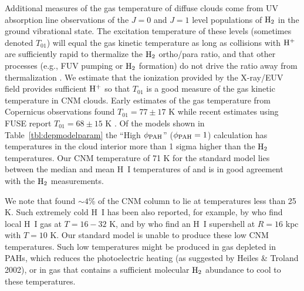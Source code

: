 \documentclass[12pt,preprint,flushrt]{aastex}
\begin{document}
Additional measures
of the gas temperature of diffuse clouds come from UV absorption 
line observations of the $J = 0$ and $J = 1$ level populations of 
${\rm H_2}$ in the ground vibrational state. The excitation temperature
of these levels (sometimes denoted $T_{01}$) will equal the
gas kinetic temperature as long as collisions with ${\rm H^+}$ are
sufficiently rapid to thermalize the ${\rm H_2}$ ortho/para ratio,
and that other processes (e.g., FUV pumping or ${\rm H_2}$ formation)
do not drive the ratio away from thermalization 
\citep[see e.g.,][]{dal77,bla87,bur92,ste99}. 
We estimate that the ionization provided by the X-ray/EUV
field provides sufficient ${\rm H^+}$ so that
$T_{01}$ is a good measure of the gas kinetic temperature in CNM clouds. 
Early
estimates of the gas temperature from Copernicus observations found
$T_{01} = 77 \pm 17$  K \citep{sav77} while recent estimates using FUSE 
report $T_{01} = 68 \pm 15$ K \citep{rac02}. Of the models shown
in Table~\ref{tbl:depmodelparam} the ``High $\phi_{\rm PAH}$'' 
($\phi_{\rm PAH} = 1$) 
calculation has  temperatures in the cloud interior
more than 1 sigma  higher than the ${\rm H_2}$ temperatures.
Our CNM temperature of 71 K for the standard model  
lies between the median and mean H~I temperatures of \cite{hei02}
and is in good agreement with the ${\rm H_2}$ measurements.  

We note that \cite{hei02} found $\sim 4$\% of the CNM column 
to lie at temperatures less than 25 K. Such extremely cold H~I
has been also reported, for example,  by \cite{gib00} who find local 
H~I gas
at $T=16-32$ K, and by \cite{knee01} who find an H~I supershell at 
$R= 16$ kpc with $T=10$ K. Our standard model is unable to produce these
low CNM temperatures.  
Such low temperatures might be produced in  
gas depleted in PAHs, which reduces 
the photoelectric heating (as suggested by Heiles \& Troland 2002), or
in  gas that contains a sufficient molecular ${\rm H_2}$ abundance  
to cool to these temperatures.
  
\end{document}
